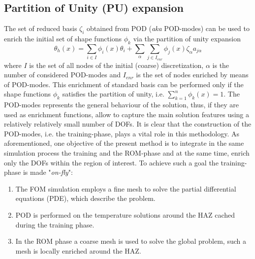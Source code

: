 \documentclass[3p]{article}
\begin{document}
\subsection*{Partition of Unity (PU) expansion}
The set of reduced basis $\zeta_{i}$ obtained from POD (\textit{aka} POD-modes) can be used to enrich the initial set of shape functions $\phi_{k}$ via the partition of unity expansion \cite{Babuska1997}
\begin{equation}
\theta_{h}(x) = \sum_{i\in I} \phi_{i}(x)\theta_{i} + \sum_{\alpha}\sum_{j\in I_{enr}} \phi_{j}(x)\zeta_{\alpha}a_{j\alpha}
\label{PartitionOfUnity}
\end{equation}
where $I$ is the set of all nodes of the initial (coarse) discretization, $\alpha$ is the number of considered POD-modes and $I_{enr}$ is the set of nodes enriched by means of POD-modes. This enrichment of standard basis can be performed only if the shape functions $\phi_{k}$ satisfies the partition of unity, i.e. $\sum_{k=1}^{n}\phi_{k}(x)=1$. The POD-modes represents the general behaviour of the solution, thus, if they are used as enrichment functions, allow to capture the main solution features using a relatively relatively small number of DOFs. It is clear that the construction of the POD-modes, i.e. the training-phase, plays a vital role in this methodology. As aforementioned, one objective of the present method is to integrate in the same simulation process the training and the ROM-phase and at the same time, enrich only the DOFs within the region of interest. To achieve such a goal the training-phase is made "\textit{on-fly}":
\begin{enumerate}
\item The FOM simulation employs a fine mesh to solve the partial differential equations (PDE), which describe the problem.
\item POD is performed on the temperature solutions around the HAZ cached during the training phase.
\item In the ROM phase a coarse mesh is used to solve the global problem, such a mesh is locally enriched around the HAZ.
\end{enumerate}

\end{document}
